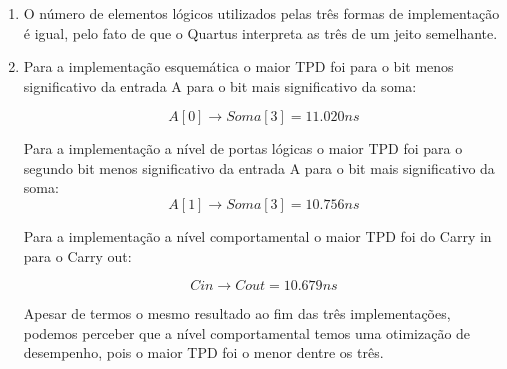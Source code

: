 \subsubsection{}
\begin{enumerate}[label=(\alph*)]
    \item  O número de elementos lógicos utilizados pelas três formas de implementação é igual, pelo fato de que o Quartus interpreta as três de um jeito semelhante.

    \item Para a implementação esquemática o maior TPD foi para o bit menos significativo da entrada A para o bit mais significativo da soma:

\begin{equation}
    A[0] \rightarrow Soma[3] = 11.020ns
\end{equation} 

Para a implementação a nível de portas lógicas o maior TPD foi para o segundo bit menos significativo da entrada A para o bit mais significativo da soma:
\begin{equation}
    A[1] \rightarrow Soma[3] = 10.756ns
\end{equation} 

Para a implementação a nível comportamental o maior TPD foi do Carry in para o Carry out: 

\begin{equation}
    Cin \rightarrow Cout = 10.679ns
\end{equation} 


Apesar de termos o mesmo resultado ao fim das três implementações, podemos perceber que a nível comportamental temos uma otimização de desempenho, pois o maior TPD foi o menor dentre os três.
\end{enumerate}